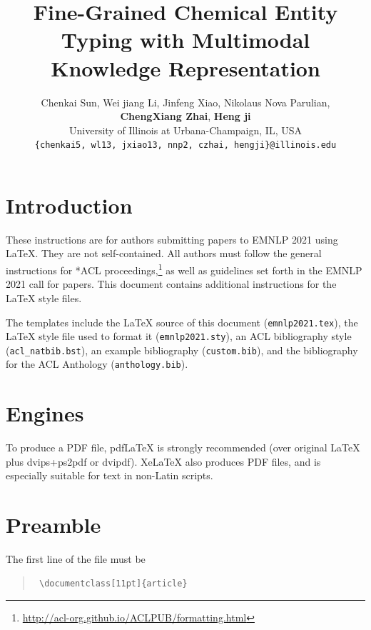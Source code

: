 \documentclass[11pt]{article}
\title{Fine-Grained Chemical Entity Typing with Multimodal Knowledge Representation}
\author{Chenkai Sun, Wei jiang Li, Jinfeng Xiao, Nikolaus Nova Parulian,\\ {\bf ChengXiang Zhai}, {\bf Heng ji} \\
         University of Illinois at Urbana-Champaign, IL, USA\\
     
\texttt{\{chenkai5, wl13, jxiao13, nnp2, czhai, hengji\}@illinois.edu} \\
}
\begin{document}
\maketitle











% 






 \section{Introduction}

 These instructions are for authors submitting papers to EMNLP 2021 using \LaTeX. They are not self-contained. All authors must follow the general instructions for *ACL proceedings,\footnote{\url{http://acl-org.github.io/ACLPUB/formatting.html}} as well as guidelines set forth in the EMNLP 2021 call for papers. This document contains additional instructions for the \LaTeX{} style files.

 The templates include the \LaTeX{} source of this document (\texttt{emnlp2021.tex}),
 the \LaTeX{} style file used to format it (\texttt{emnlp2021.sty}),
 an ACL bibliography style (\texttt{acl\_natbib.bst}),
 an example bibliography (\texttt{custom.bib}),
 and the bibliography for the ACL Anthology (\texttt{anthology.bib}).

 \section{Engines}

 To produce a PDF file, pdf\LaTeX{} is strongly recommended (over original \LaTeX{} plus dvips+ps2pdf or dvipdf). Xe\LaTeX{} also produces PDF files, and is especially suitable for text in non-Latin scripts.

 \section{Preamble}

 The first line of the file must be
 \begin{quote}
 \begin{verbatim}
 \documentclass[11pt]{article}
 \end{verbatim}
 \end{quote}
\end{document}
